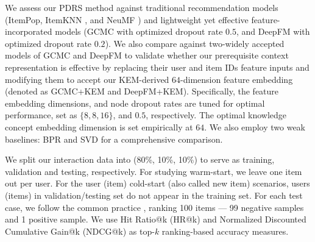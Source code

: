 We assess our PDRS method against traditional recommendation models (ItemPop, ItemKNN \cite{sarwar2001item}, and NeuMF \cite{he2017neural}) and lightweight yet effective feature-incorporated models (GCMC  \cite{berg2017graph} with optimized dropout rate $0.5$, and DeepFM \cite{guo2017deepfm} with optimized dropout rate $0.2$). 
We also compare against two-widely accepted models of GCMC and DeepFM to validate whether our prerequisite context representation is effective
by replacing their user and item IDs feature inputs and modifying them to accept our KEM-derived $64$-dimension feature embedding (denoted as GCMC+KEM and DeepFM+KEM).
Specifically, the feature embedding dimensions, and node dropout rates are tuned for optimal performance, set as $\{8,8,16\}$, and $0.5$, respectively. The optimal knowledge concept embedding dimension is set empirically at $64$.
We also employ two weak baselines: BPR \cite{rendle2012bpr} and SVD \cite{koren2009matrix} for a comprehensive comparison. 





We split our interaction data into (80\%, 10\%, 10\%) to serve as training, validation and testing, respectively.  For studying warm-start, we leave one item out per user.  For the user (item) cold-start (also called new item) scenarios, users (items) in validation/testing set do not appear in the training set. For each test case, we follow the common practice \cite{he2017neural}, ranking 100 items --- 99 negative samples and 1 positive sample. We use Hit Ratio@k (HR@k) and Normalized Discounted Cumulative Gain@k (NDCG@k) \cite{Shani2011evaluating} as top-$k$ ranking-based accuracy measures.

